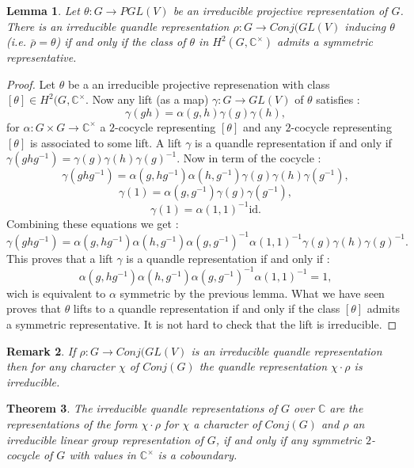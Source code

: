 \documentclass[12pt, reqno]{amsart}
\newtheorem{theorem}{Theorem}[section]
\newtheorem{remark}[theorem]{Remark}
\newtheorem{lemma}[theorem]{Lemma}
\begin{document}
\begin{lemma}\label{lem}
Let $\theta : G \to PGL(V)$ be an irreducible projective representation of $G$. There is an irreducible quandle representation $\rho:G\to Conj(GL(V)$ inducing $\theta$ (i.e. $\bar{\rho}=\theta$) if and only if the class of $\theta$ in $H^2(G,\mathbb{C}^\times)$ admits a symmetric representative. 
\end{lemma}
\begin{proof}
Let $\theta$ be a an irreducible projective represenation with class $[\theta]\in H^2(G,\mathbb{C}^\times$. Now any lift (as a map) $\gamma : G \to GL(V)$ of $\theta$ satisfies :
$$\gamma(gh)=\alpha(g,h)\gamma(g)\gamma(h),$$
for $\alpha : G\times G\to \mathbb{C}^\times$ a $2$-cocycle representing $[\theta]$ and any $2$-cocycle representing $[\theta]$ is associated to some lift. A lift $\gamma$ is a quandle representation if and only if $\gamma(ghg^{-1})=\gamma(g)\gamma(h)\gamma(g)^{-1}$. Now in term of the cocycle : 
$$\gamma(ghg^{-1})=\alpha(g,hg^{-1})\alpha(h,g^{-1})\gamma(g)\gamma(h)\gamma(g^{-1}),$$
$$\gamma(1)=\alpha(g,g^{-1})\gamma(g)\gamma(g^{-1}),$$
$$\gamma(1)=\alpha(1,1)^{-1}\mathrm{id}.$$
Combining these equations we get :
$$\gamma(ghg^{-1})=\alpha(g,hg^{-1})\alpha(h,g^{-1})\alpha(g,g^{-1})^{-1}\alpha(1,1)^{-1}\gamma(g)\gamma(h)\gamma(g)^{-1}.$$
This proves that a lift $\gamma$ is a quandle representation if and only if :
$$\alpha(g,hg^{-1})\alpha(h,g^{-1})\alpha(g,g^{-1})^{-1}\alpha(1,1)^{-1}=1,$$
wich is equivalent to $\alpha$ symmetric by the previous lemma. What we have seen proves that $\theta$ lifts to a quandle representation if and only if the class $[\theta]$ admits a symmetric representative. It is not hard to check that the lift is irreducible.
\end{proof}
\begin{remark}
If $\rho :G \to Conj(GL(V)$ is an irreducible quandle representation then for any character $\chi$ of $Conj(G)$ the quandle representation $\chi \cdot \rho$ is irreducible. 
\end{remark}
\begin{theorem}
The irreducible quandle representations of $G$ over $\mathbb{C}$ are the representations of the form $\chi \cdot \rho$ for $\chi$ a character of $Conj(G)$ and $\rho$ an irreducible linear group representation of $G$, if and only if any symmetric $2$-cocycle of $G$ with values in $\mathbb{C}^\times$ is a coboundary.
\end{theorem}
\end{document}
